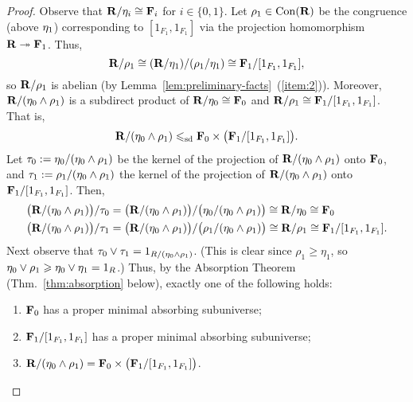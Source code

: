 \begin{proof}
Observe that $\mathbf{R}/\eta_i \cong \mathbf{F}_i$ for $i \in \{0,1\}$.
Let $\rho_1 \in \operatorname{Con}(\mathbf{R})$ be the congruence
(above $\eta_1$) corresponding to $[1_{F_1}, 1_{F_1}]$ via the projection
homomorphism $\mathbf{R} \twoheadrightarrow \mathbf{F}_1$.  Thus,
\[
\mathbf{R}/\rho_1 \cong (\mathbf{R}/\eta_1)/(\rho_1/\eta_1) \cong \mathbf{F}_1/[1_{F_1}, 1_{F_1}],
\]
so $\mathbf{R}/\rho_1$ is abelian
(by Lemma~\ref{lem:preliminary-facts}~(\ref{item:2})).
Moreover, $\mathbf{R}/(\eta_0\wedge \rho_1)$ is a subdirect
product of $\mathbf{R}/\eta_0 \cong \mathbf{F}_0$ and  
$\mathbf{R}/\rho_1 \cong \mathbf{F}_1/[1_{F_1}, 1_{F_1}]$.  That is,
\[
\mathbf{R}/(\eta_0\wedge \rho_1) \leqslant_{\mathrm{sd}} \mathbf{F}_0\times 
\bigl(\mathbf{F}_1/[1_{F_1}, 1_{F_1}]\bigr).
\]
Let  $\tau_0 := \eta_0/(\eta_0\wedge \rho_1)$ be the kernel of the
projection of $\mathbf{R}/(\eta_0\wedge \rho_1)$ onto $\mathbf{F}_0$, and 
$\tau_1 := \rho_1/(\eta_0\wedge \rho_1)$ the kernel of the
projection of $\mathbf{R}/(\eta_0\wedge \rho_1)$ onto $\mathbf{F}_1/[1_{F_1},1_{F_1}]$.
Then,
\begin{align*}
\bigl(\mathbf{R}/(\eta_0\wedge \rho_1)\bigr)/\tau_0&=
\bigl(\mathbf{R}/(\eta_0\wedge \rho_1)\bigr)/\bigl(\eta_0/(\eta_0\wedge \rho_1)\bigr)
\cong \mathbf{R}/\eta_0 \cong \mathbf{F}_0\\
\bigl(\mathbf{R}/(\eta_0\wedge \rho_1)\bigr)/\tau_1&=
\bigl(\mathbf{R}/(\eta_0\wedge \rho_1)\bigr)/\bigl(\rho_1/(\eta_0\wedge \rho_1)\bigr)
\cong \mathbf{R}/\rho_1 \cong \mathbf{F}_1/[1_{F_1},1_{F_1}].
\end{align*}
Next observe that
$\tau_0\vee \tau_1 = 1_{R/(\eta_0\wedge \rho_1)}$. (This is clear since
$\rho_1\geq \eta_1$, so  $\eta_0 \vee \rho_1 \geqslant \eta_0 \vee \eta_1 = 1_R$.)
Thus, by the Absorption Theorem (Thm.~\ref{thm:absorption} below),
exactly one of the following holds:
\begin{enumerate}
\item \label{item:7} $\mathbf{F}_0$ has a proper minimal absorbing subuniverse;
\item \label{item:8} $\mathbf{F}_1/[1_{F_1}, 1_{F_1}]$ has a proper minimal
  absorbing subuniverse; 
\item \label{item:6} $\mathbf{R}/(\eta_0\wedge \rho_1) =\mathbf{F}_0 \times \bigl(\mathbf{F}_1/[1_{F_1}, 1_{F_1}]\bigr)$.
\end{enumerate}


\end{proof}
